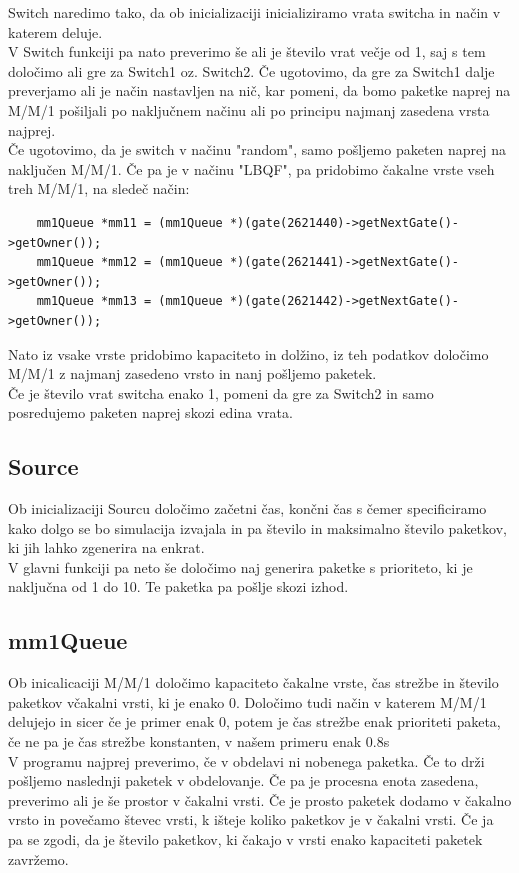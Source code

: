 \documentclass[a4paper,11pt]{article}
\begin{document}
Switch naredimo tako, da ob inicializaciji inicializiramo vrata switcha in način v katerem deluje. \\
V Switch funkciji pa nato preverimo še ali je število vrat večje od 1, saj s tem določimo ali gre za Switch1 oz. Switch2. Če ugotovimo, da gre za Switch1 dalje preverjamo ali je način nastavljen na nič, kar pomeni, da bomo paketke naprej na M/M/1 pošiljali po naključnem načinu ali po principu najmanj zasedena vrsta najprej. \\
Če ugotovimo, da je switch v načinu "random", samo pošljemo paketen naprej na naključen M/M/1. Če pa je v načinu "LBQF", pa pridobimo čakalne vrste vseh treh M/M/1, na sledeč način:
\begin{lstlisting}
    mm1Queue *mm11 = (mm1Queue *)(gate(2621440)->getNextGate()->getOwner());
    mm1Queue *mm12 = (mm1Queue *)(gate(2621441)->getNextGate()->getOwner());
    mm1Queue *mm13 = (mm1Queue *)(gate(2621442)->getNextGate()->getOwner());
\end{lstlisting}  

Nato iz vsake vrste pridobimo kapaciteto in dolžino, iz teh podatkov določimo M/M/1 z najmanj zasedeno vrsto in nanj pošljemo paketek. \\
Če je število vrat switcha enako 1, pomeni da gre za Switch2 in samo posredujemo paketen naprej skozi edina vrata.

\subsection{Source}

Ob inicializaciji Sourcu določimo začetni čas, končni čas s čemer specificiramo kako dolgo se bo simulacija izvajala in pa število in maksimalno število paketkov, ki jih lahko zgenerira na enkrat. \\
V glavni funkciji pa neto še določimo naj generira paketke s prioriteto, ki je naključna od 1 do 10. Te paketka pa pošlje skozi izhod.

\subsection{mm1Queue}

Ob inicalicaciji M/M/1 določimo kapaciteto čakalne vrste, čas strežbe in število paketkov včakalni vrsti, ki je enako 0. Določimo tudi način v katerem M/M/1 delujejo in sicer če je primer enak 0, potem je čas strežbe enak prioriteti paketa, če ne pa je čas strežbe konstanten, v našem primeru enak 0.8s \\
V programu najprej preverimo, če v obdelavi ni nobenega paketka. Če to drži pošljemo naslednji paketek v obdelovanje. Če pa je procesna enota zasedena, preverimo ali je še prostor v čakalni vrsti. Če je prosto paketek dodamo v čakalno vrsto in povečamo števec vrsti, k išteje koliko paketkov je v čakalni vrsti. Če ja pa se zgodi, da je število paketkov, ki čakajo v vrsti enako kapaciteti paketek zavržemo.
\end{document}
